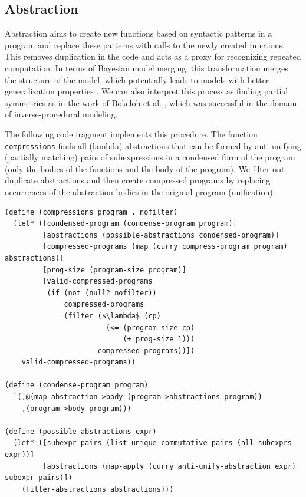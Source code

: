 \documentclass[a4paper,10pt]{article}
\begin{document}
\subsection{Abstraction}

Abstraction aims to create new functions based on syntactic patterns in a program and replace these patterns with calls to the newly created functions.
This removes duplication in the code and acts as a proxy for recognizing repeated computation.
In terms of Bayesian model merging, this transformation merges the structure of the model, which potentially leads to models with better generalization properties \cite{Stolcke:1994:IPG:645515.658235}. We can also interpret this process as finding partial symmetries as in the work of Bokeloh et al. \cite{DBLP:journals/tog/BokelohWS10}, which was successful in the domain of inverse-procedural modeling.

The following code fragment implements this procedure. The function \texttt{compressions} finds all (lambda) abstractions that can be formed by anti-unifying (partially matching) pairs of subexpressions in a condensed form of the program (only the bodies of the functions and the body of the program). We filter out duplicate abstractions and then create compressed programs by replacing occurrences of the abstraction bodies in the original program (unification).

\begin{lstlisting}[frame=trbl]
(define (compressions program . nofilter)
  (let* ([condensed-program (condense-program program)]
         [abstractions (possible-abstractions condensed-program)]
         [compressed-programs (map (curry compress-program program) abstractions)]
         [prog-size (program-size program)]
         [valid-compressed-programs
          (if (not (null? nofilter))
              compressed-programs
              (filter ($\lambda$ (cp)
                        (<= (program-size cp)
                            (+ prog-size 1)))
                      compressed-programs))])
    valid-compressed-programs))

(define (condense-program program)
  `(,@(map abstraction->body (program->abstractions program))
    ,(program->body program)))

(define (possible-abstractions expr)
  (let* ([subexpr-pairs (list-unique-commutative-pairs (all-subexprs expr))]
         [abstractions (map-apply (curry anti-unify-abstraction expr) subexpr-pairs)])
    (filter-abstractions abstractions)))
\end{lstlisting}
\end{document}
